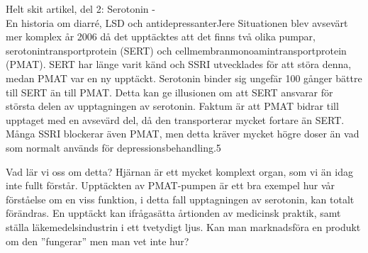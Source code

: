 \documentclass{spektraklet}
\begin{document}
\begin{artikel}{Helt skit artikel, del 2: Serotonin - \\ En historia om diarré, LSD och antidepressanter}{Jere}
Situationen blev avsevärt mer komplex år 2006 då det upptäcktes att det finns två olika pumpar, serotonintransportprotein (SERT) och cellmembranmonoamintransportprotein (PMAT). SERT har länge varit känd och SSRI utvecklades för att störa denna, medan PMAT var en ny upptäckt. Serotonin binder sig ungefär 100 gånger bättre till SERT än till PMAT. Detta kan ge illusionen om att SERT ansvarar för största delen av upptagningen av serotonin. Faktum är att PMAT bidrar till upptaget med en avsevärd del, då den transporterar mycket fortare än SERT. Många SSRI blockerar även PMAT, men detta kräver mycket högre doser än vad som normalt används för depressionsbehandling.5

Vad lär vi oss om detta? Hjärnan är ett mycket komplext organ, som vi än idag inte fullt förstår. Upptäckten av PMAT-pumpen är ett bra exempel hur vår förståelse om en viss funktion, i detta fall upptagningen av serotonin, kan totalt förändras. En upptäckt kan ifrågasätta årtionden av medicinsk praktik, samt ställa läkemedelsindustrin i ett tvetydigt ljus. Kan man marknadsföra en produkt om den ”fungerar” men man vet inte hur?

\end{artikel}
\end{document}
